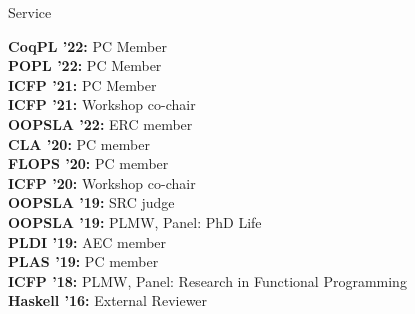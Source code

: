 \documentclass{resume} %
\begin{document}

\newcommand{\serve}[2]{
  {\bf #1:} #2 \\
  }


\begin{rSection}{Service}

  \serve{CoqPL '22}{PC Member}
  \serve{POPL '22}{PC Member}
  \serve{ICFP '21}{PC Member}
  \serve{ICFP '21}{Workshop co-chair}
  \serve{OOPSLA '22}{ERC member}
  \serve{CLA '20}{PC member}
  \serve{FLOPS '20}{PC member}
  \serve{ICFP '20}{Workshop co-chair}
  \serve{OOPSLA '19}{SRC judge}
  \serve{OOPSLA '19}{PLMW, Panel: PhD Life}
  \serve{PLDI '19}{AEC member}
  \serve{PLAS '19}{PC member}
  \serve{ICFP '18}{PLMW, Panel: Research in Functional Programming}
  \serve{Haskell '16}{External Reviewer}
  
\end{rSection}

\end{document}
